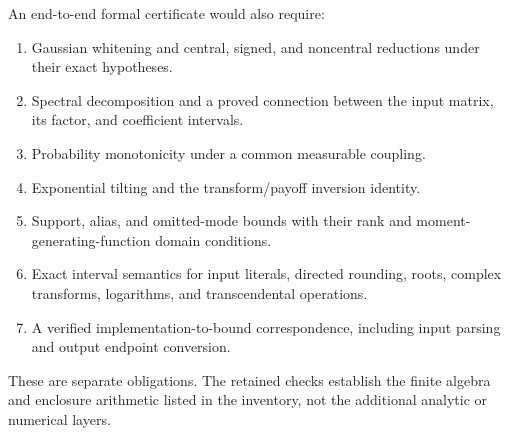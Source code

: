 An end-to-end formal certificate would also require:
\begin{enumerate}[nosep,topsep=4pt]
 \item Gaussian whitening and central, signed, and noncentral reductions
 under their exact hypotheses.
 \item Spectral decomposition and a proved connection between the input
 matrix, its factor, and coefficient intervals.
 \item Probability monotonicity under a common measurable coupling.
 \item Exponential tilting and the transform/payoff inversion identity.
 \item Support, alias, and omitted-mode bounds with their rank and
 moment-generating-function domain conditions.
 \item Exact interval semantics for input literals, directed rounding,
 roots, complex transforms, logarithms, and transcendental operations.
 \item A verified implementation-to-bound correspondence, including
 input parsing and output endpoint conversion.
\end{enumerate}
These are separate obligations. The retained checks establish the finite
algebra and enclosure arithmetic listed in the inventory, not the
additional analytic or numerical layers.
